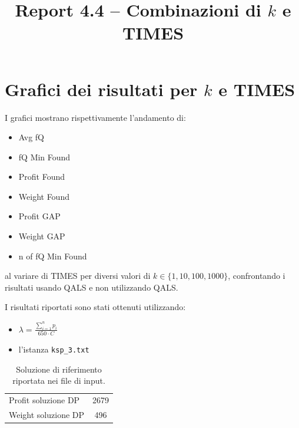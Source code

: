 \documentclass[a4paper,12pt]{article}
\title{Report 4.4 -- Combinazioni di $k$ e TIMES}
\begin{document}
\maketitle

\newpage

\section{Grafici dei risultati per $k$ e TIMES}

I grafici mostrano rispettivamente l'andamento di:
\begin{itemize}
    \item Avg fQ
    \item fQ Min Found
    \item Profit Found
    \item Weight Found
    \item Profit GAP
    \item Weight GAP
    \item n of fQ Min Found
\end{itemize}
al variare di TIMES per diversi valori di $k \in \{1,10,100,1000\}$, confrontando
i risultati usando QALS e non utilizzando QALS.

I risultati riportati sono stati ottenuti utilizzando:

\begin{itemize}
    \item $\lambda = \frac{\sum_{i=1}^{n} p_i}{650 \cdot C}$
    \item l'istanza \texttt{ksp\_3.txt}
\end{itemize}

\begin{table}[H]
\centering
\begin{tabular}{lc}
\hline
Profit soluzione DP & 2679 \\
Weight soluzione DP & 496 \\
\hline
\end{tabular}
\caption{Soluzione di riferimento riportata nei file di input.}
\label{tab:knapsack-solution}
\end{table}
\end{document}
